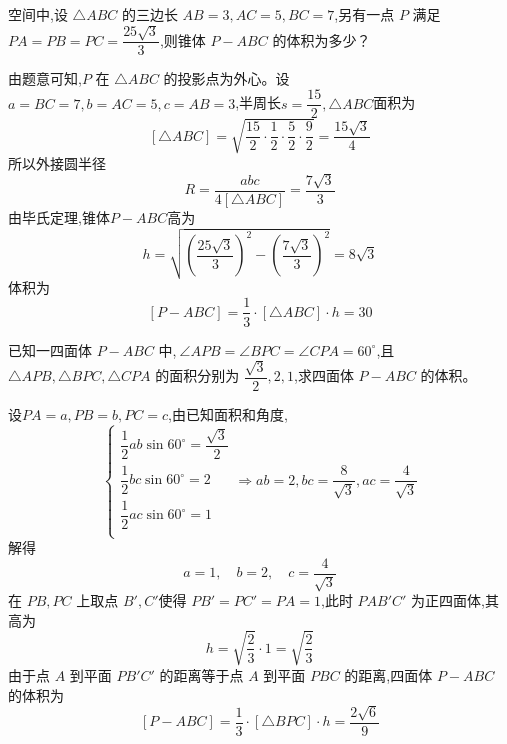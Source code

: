 \begin{questions}
    
    \question 空间中,设 $\triangle ABC$ 的三边长 $AB=3,AC=5,BC=7$,另有一点 $P$ 满足 $PA = PB = PC = \dfrac{25\sqrt{3}}{3}$,则锥体 $P-ABC$ 的体积为多少？
    \begin{solution}
        由题意可知,$P$ 在 $\triangle ABC$ 的投影点为外心。设$a = BC = 7, b = AC = 5, c = AB = 3$,半周长$s = \dfrac{15}{2},\triangle ABC$面积为
        \[
        [\triangle ABC] = \sqrt{\frac{15}{2} \cdot \frac{1}{2} \cdot \frac{5}{2} \cdot \frac{9}{2}} = \frac{15\sqrt 3}{4}
        \]  
        所以外接圆半径
        \[
        R = \frac{abc}{4 [\triangle ABC]} =\frac{7\sqrt 3}{3}
        \]  
        由毕氏定理,锥体$P-ABC$高为
        \[
        h = \sqrt{\left(\frac{25\sqrt 3}{3}\right)^2 - \left(\frac{7\sqrt 3}{3}\right)^2} = 8\sqrt 3
        \]  
        体积为
        \[
        [P-ABC] = \frac{1}{3} \cdot [\triangle ABC] \cdot h =30
        \]  
    \end{solution}

    \question 已知一四面体 $P-ABC$ 中,$\ \angle APB = \angle BPC = \angle CPA = 60^{\circ}$,且 $\triangle APB,\triangle BPC,\triangle CPA$ 的面积分别为 $\dfrac{\sqrt{3}}{2},2,1$,求四面体 $P-ABC$ 的体积。
    \begin{solution}
        设$PA=a,PB=b,PC=c$,由已知面积和角度,
        \[
        \begin{cases}
            \dfrac{1}{2} ab \sin 60^\circ = \dfrac{\sqrt{3}}{2}\\[6pt]
            \dfrac{1}{2} bc \sin 60^\circ = 2 \\[6pt]
            \dfrac{1}{2} ac \sin 60^\circ = 1 \\[6pt]
        \end{cases}
        \Rightarrow ab = 2 , bc = \frac{8}{\sqrt{3}} , ac = \frac{4}{\sqrt{3}}
        \]
        解得
        \[
        a = 1, \quad b = 2, \quad c = \frac{4}{\sqrt{3}}
        \]
        在 $PB,PC$ 上取点 $B',C'$使得 $PB' = PC' = PA = 1$,此时 $PAB'C'$ 为正四面体,其高为
        \[
        h = \sqrt{\frac{2}{3}} \cdot 1 = \sqrt{\frac{2}{3}}
        \]
        由于点 $A$ 到平面 $PB'C'$ 的距离等于点 $A$ 到平面 $PBC$ 的距离,四面体 $P-ABC$ 的体积为
        \[
        [P-ABC] = \frac{1}{3} \cdot [\triangle BPC] \cdot h = \frac{2\sqrt{6}}{9}
        \]
    \end{solution}


\end{questions}
